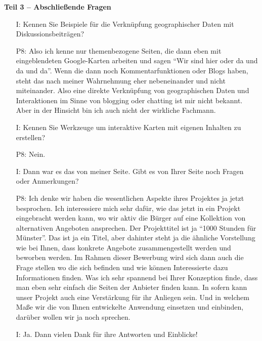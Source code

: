 \textbf{Teil 3 -- Abschlie{\ss}ende Fragen}
\begin{itemize}
    \item[I:] Kennen Sie Beispiele f{\"u}r die Verkn{\"u}pfung geographischer Daten mit Diskussionsbeitr{\"a}gen?
    \item[P8:] Also ich kenne nur themenbezogene Seiten, die dann eben mit eingeblendeten Google-Karten arbeiten und sagen "`Wir sind hier oder da und da und da"'. Wenn die dann noch Kommentarfunktionen oder Blogs haben, steht das nach meiner Wahrnehmung eher nebeneinander und nicht miteinander. Also eine direkte Verkn{\"u}pfung von geographischen Daten und Interaktionen im Sinne von blogging oder chatting ist mir nicht bekannt. Aber in der Hinsicht bin ich auch nicht der wirkliche Fachmann.
    \item[I:] Kennen Sie Werkzeuge um interaktive Karten mit eigenen Inhalten zu erstellen?
    \item[P8:] Nein.
    \item[I:] Dann war es das von meiner Seite. Gibt es von Ihrer Seite noch Fragen oder Anmerkungen?
    \item[P8:] Ich denke wir haben die wesentlichen Aspekte ihres Projektes ja jetzt besprochen. Ich interessiere mich sehr daf{\"u}r, wie das jetzt in ein Projekt eingebracht werden kann, wo wir aktiv die B{\"u}rger auf eine Kollektion von alternativen Angeboten ansprechen. Der Projekttitel ist ja "`1000 Stunden f{\"u}r M{\"u}nster"'. Das ist ja ein Titel, aber dahinter steht ja die {\"a}hnliche Vorstellung wie bei Ihnen, dass konkrete Angebote zusammengestellt werden und beworben werden. Im Rahmen dieser Bewerbung wird sich dann auch die Frage stellen wo die sich befinden und wie k{\"o}nnen Interessierte dazu Informationen finden. Was ich sehr spannend bei Ihrer Konzeption finde, dass man eben sehr einfach die Seiten der Anbieter finden kann. In sofern kann unser Projekt auch eine Verst{\"a}rkung f{\"u}r ihr Anliegen sein. Und in welchem Ma{\ss}e wir die von Ihnen entwickelte Anwendung einsetzen und einbinden, dar{\"u}ber wollen wir ja noch sprechen.
    \item[I:] Ja. Dann vielen Dank f{\"u}r ihre Antworten und Einblicke!
\end{itemize}